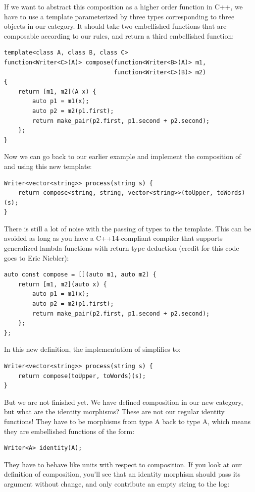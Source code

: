 If we want to abstract this composition as a higher order function in
C++, we have to use a template parameterized by three types
corresponding to three objects in our category. It should take two
embellished functions that are composable according to our rules, and
return a third embellished function:

\begin{Verbatim}
template<class A, class B, class C>
function<Writer<C>(A)> compose(function<Writer<B>(A)> m1,
                               function<Writer<C>(B)> m2)
{
    return [m1, m2](A x) {
        auto p1 = m1(x);
        auto p2 = m2(p1.first);
        return make_pair(p2.first, p1.second + p2.second); 
    };
}
\end{Verbatim}
Now we can go back to our earlier example and implement the composition
of  and  using this new template:

\begin{verbatim}
Writer<vector<string>> process(string s) { 
    return compose<string, string, vector<string>>(toUpper, toWords)(s);
}
\end{verbatim}
There is still a lot of noise with the passing of types to the
 template. This can be avoided as long as you have a
C++14-compliant compiler that supports generalized lambda functions with
return type deduction (credit for this code goes to Eric Niebler):

\begin{Verbatim}
auto const compose = [](auto m1, auto m2) { 
    return [m1, m2](auto x) { 
        auto p1 = m1(x);
        auto p2 = m2(p1.first);
        return make_pair(p2.first, p1.second + p2.second);
    };
};
\end{Verbatim}
In this new definition, the implementation of 
simplifies to:

\begin{Verbatim}
Writer<vector<string>> process(string s) {
    return compose(toUpper, toWords)(s);
}
\end{Verbatim}
But we are not finished yet. We have defined composition in our new
category, but what are the identity morphisms? These are not our regular
identity functions! They have to be morphisms from type A back to type
A, which means they are embellished functions of the form:

\begin{Verbatim}
Writer<A> identity(A);
\end{Verbatim}
They have to behave like units with respect to composition. If you look
at our definition of composition, you'll see that an identity morphism
should pass its argument without change, and only contribute an empty
string to the log:

